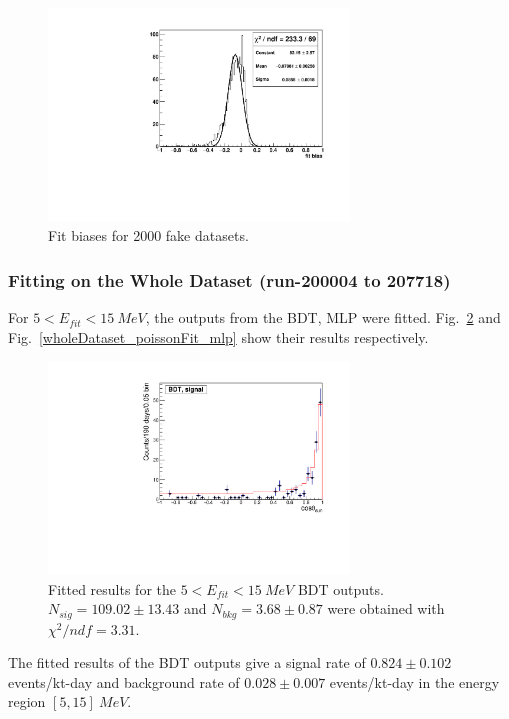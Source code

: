 \begin{figure}[!htb]
	\centering
	\includegraphics[width=8cm]{ensemble_fitBias.pdf}
	\caption{Fit biases for 2000 fake datasets.}
	\label{poisson_fitBias}
\end{figure} 

\subsubsection{Fitting on the Whole Dataset (run-200004 to 207718)}
For $5<E_{fit}<15~MeV$, the outputs from the BDT, MLP were fitted. Fig.~\ref{wholeDataset_poissonFit_bdt} and Fig.~\ref{wholeDataset_poissonFit_mlp} show their results respectively.

\begin{figure}[!htb]
	\centering
	\includegraphics[width=8cm]{wholedataFit_bdt.pdf}
	\caption{Fitted results for the $5<E_{fit}<15~MeV$ BDT outputs. $N_{sig}=109.02\pm13.43$ and $N_{bkg}=3.68\pm0.87$ were obtained with $\chi^2/ndf=3.31$.}
	\label{wholeDataset_poissonFit_bdt}
\end{figure} 
The fitted results of the BDT outputs give a signal rate of $0.824\pm0.102$ events/kt-day and background rate of $0.028\pm 0.007$ events/kt-day in the energy region $[5,15]~MeV$.

